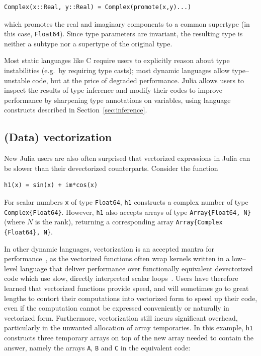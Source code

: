 \documentclass[pldi]{sigplanconf-pldi15}
\begin{document}
\begin{lstlisting}
Complex(x::Real, y::Real) = Complex(promote(x,y)...)
\end{lstlisting}
%
which promotes the real and imaginary components to a common supertype (in this
case, \verb|Float64|). Since type parameters are invariant, the resulting type
is neither a subtype nor a supertype of the original type.

Most static languages like C require users to explicitly reason about type
instabilities (e.g.\ by requiring type casts); most dynamic languages allow
type--unstable code, but at the price of degraded performance. Julia allows
users to inspect the results of type inference and modify their codes to
improve performance by sharpening type annotations on variables, using language
constructs described in Section~\ref{sec:inference}.


\subsection{(Data) vectorization}

New Julia users are also often surprised that vectorized expressions in Julia
can be slower than their devectorized counterparts. Consider the function

\begin{lstlisting}
h1(x) = sin(x) + im*cos(x)
\end{lstlisting}
%
For scalar numbers \verb|x| of type \verb|Float64|, \verb|h1| constructs a
complex number of type \verb|Complex{Float64}|. However, \verb|h1| also accepts
arrays of type \verb|Array{Float64, N}| (where $N$ is the rank), returning a
corresponding array \verb|Array{Complex| \verb|{Float64}, N}|.

In other dynamic languages, vectorization is an accepted mantra for
performance~\cite{matlabuserguide,Langtangen2008}, as the vectorized functions often wrap
kernels written in a low--level language that deliver performance over
functionally equivalent devectorized code which use slow, directly interpreted
scalar loops~\cite{Seljebotn2009,Walt2011}. Users have therefore learned that
vectorized functions provide speed, and will sometimes go to great lengths to
contort their computations into vectorized form to speed up their code, even if
the computation cannot be expressed conveniently or naturally in vectorized
form. Furthermore, vectorization still incurs significant overhead,
particularly in the unwanted allocation of array temporaries. In this example,
\verb|h1| constructs three temporary arrays on top of the new array needed to
contain the answer, namely the arrays \verb|A|, \verb|B| and \verb|C| in the
equivalent code: 
\end{document}
